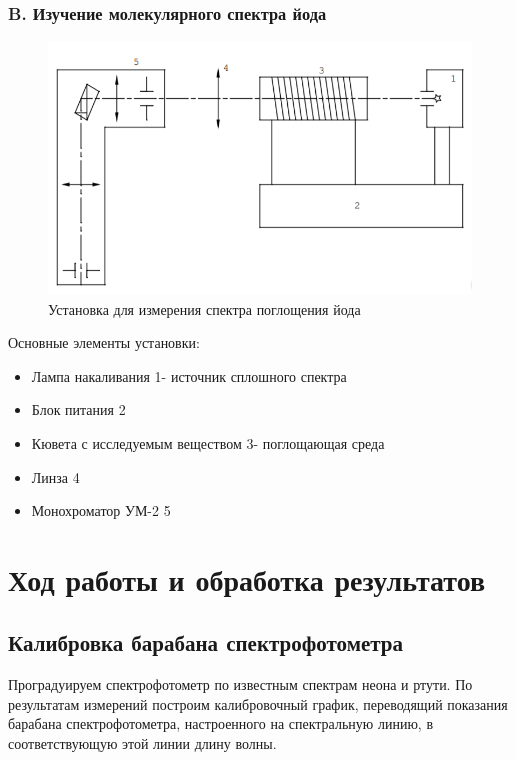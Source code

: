 \documentclass[a4paper,12pt]{article} %
\begin{document}
\subsubsection*{B. Изучение молекулярного спектра йода}
\begin{figure} 
\vspace{-5ex}
\includegraphics[width=\linewidth]{установка йод.png}
\caption{Установка для измерения спектра поглощения йода}
\label{fig:somelabel}
\end{figure}
Основные элементы установки:
\begin{itemize}
    \item Лампа накаливания 1- источник сплошного спектра
    \item Блок питания 2
    \item Кювета с исследуемым веществом 3- поглощающая среда
    \item Линза 4
    \item Монохроматор УМ-2 5
\end{itemize}

\newpage
\section*{Ход работы и обработка результатов}
\subsection*{Калибровка барабана спектрофотометра}
Проградуируем спектрофотометр по известным спектрам неона и ртути. По результатам измерений построим калибровочный график, переводящий показания барабана спектрофотометра, настроенного на спектральную линию,  в соответствующую этой линии длину волны.
\\
\end{document}
